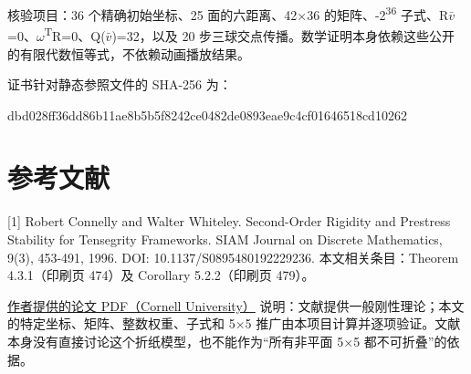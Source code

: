 \documentclass[UTF8,a4paper,11pt]{ctexart}
\begin{document}
核验项目：36 个精确初始坐标、25 面的六距离、42\(\times\)36 的矩阵、-2\textsuperscript{36} 子式、R\(\bar v\)=0、\(\omega\)\textsuperscript{T}R=0、Q(\(\bar v\))=32，以及 20 步三球交点传播。数学证明本身依赖这些公开的有限代数恒等式，不依赖动画播放结果。

证书针对静态参照文件的 SHA-256 为：

dbd028ff36dd86b11ae8b5b5f8242ce0482de0893eae9c4cf01646518cd10262

\section*{参考文献}
[1] Robert Connelly and Walter Whiteley. Second-Order Rigidity and Prestress Stability for Tensegrity Frameworks. SIAM Journal on Discrete Mathematics, 9(3), 453-491, 1996. DOI: 10.1137/S0895480192229236. 本文相关条目：Theorem 4.3.1（印刷页 474）及 Corollary 5.2.2（印刷页 479）。

\href{https://pi.math.cornell.edu/~connelly/pdf/10.1137_S0895480192229236.pdf}{作者提供的论文 PDF（Cornell University）}
说明：文献提供一般刚性理论；本文的特定坐标、矩阵、整数权重、子式和 5\(\times\)5 推广由本项目计算并逐项验证。文献本身没有直接讨论这个折纸模型，也不能作为“所有非平面 5\(\times\)5 都不可折叠”的依据。
\end{document}

